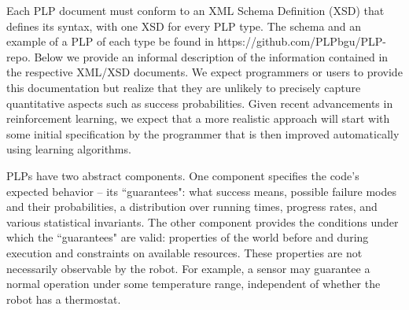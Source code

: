 \documentclass[letterpaper]{article}
\newcommand\mNote[1]{\todo[inline, author=Michael, color=cyan]{#1}}
\newcommand\rNote[1]{\todo[inline, author=Ronen, color=yellow]{#1}}
\begin{document}
Each PLP document must conform to an XML Schema Definition (XSD) that defines its syntax,
with
one XSD for every PLP type.
The  schema and an example of a PLP of each type be found in https://github.com/PLPbgu/PLP-repo. Below we provide an informal description of the information contained in the respective XML/XSD documents. We expect programmers or users to provide this documentation
but realize that they are unlikely to 
precisely capture
quantitative aspects such as success probabilities. Given recent advancements in reinforcement learning, we expect that a more realistic approach will start with some initial specification by the programmer that is then improved automatically using learning algorithms.






PLPs have two abstract components. One component specifies the code's expected behavior -- its ``guarantees": what success means,  possible failure modes and their probabilities, a distribution over running times, progress rates, and
various statistical invariants. The other component provides the conditions under which the ``guarantees" are valid:
properties of the world before and during execution and constraints on available resources. These properties are not necessarily observable by the robot. For example, a sensor may guarantee a normal operation under some temperature range, independent of whether the robot has a thermostat.




\end{document}
